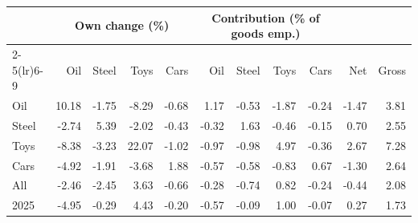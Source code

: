 \begin{tabular}{lrrrrrrrrrr}
\toprule
 & \multicolumn{4}{c}{Own change (\%)} & \multicolumn{4}{c}{Contribution (\% of goods emp.)} & & \\
\cmidrule(lr){2-5}\cmidrule(lr){6-9}
 & Oil & Steel & Toys & Cars & Oil & Steel & Toys & Cars & Net & Gross \\
\midrule
Oil & 10.18 & -1.75 & -8.29 & -0.68 & 1.17 & -0.53 & -1.87 & -0.24 & -1.47 & 3.81 \\
Steel & -2.74 & 5.39 & -2.02 & -0.43 & -0.32 & 1.63 & -0.46 & -0.15 & 0.70 & 2.55 \\
Toys & -8.38 & -3.23 & 22.07 & -1.02 & -0.97 & -0.98 & 4.97 & -0.36 & 2.67 & 7.28 \\
Cars & -4.92 & -1.91 & -3.68 & 1.88 & -0.57 & -0.58 & -0.83 & 0.67 & -1.30 & 2.64 \\
All & -2.46 & -2.45 & 3.63 & -0.66 & -0.28 & -0.74 & 0.82 & -0.24 & -0.44 & 2.08 \\
2025 & -4.95 & -0.29 & 4.43 & -0.20 & -0.57 & -0.09 & 1.00 & -0.07 & 0.27 & 1.73 \\
\bottomrule
\end{tabular}
